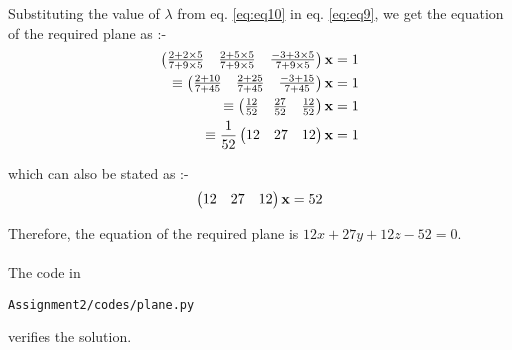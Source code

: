\documentclass[journal,12pt,twocolumn]{IEEEtran}
\renewcommand\thesection{\arabic{section}}
\begin{document}
\begin{enumerate}[label=\thesection.\arabic*.,ref=\thesection.\theenumi]
Substituting the value of $\lambda$ from eq. \eqref{eq:eq10} in eq. \eqref{eq:eq9}, we get the equation of the required plane as :-
\begin{align}
\begin{pmatrix}\frac{2 + 2 \times 5}{7 + 9 \times 5} & \frac{2 + 5 \times 5}{7 + 9 \times 5} & \frac{-3 + 3 \times 5}{7 + 9 \times 5}\end{pmatrix}\mathbf{x} = 1
\\
\equiv \begin{pmatrix}\frac{2 + 10}{7 + 45} & \frac{2 + 25}{7 + 45} & \frac{-3 + 15}{7 + 45}\end{pmatrix}\mathbf{x} = 1
\\
\equiv \begin{pmatrix}\frac{12}{52} & \frac{27}{52} & \frac{12}{52}\end{pmatrix}\mathbf{x} = 1
\\
\equiv \frac{1}{52} \begin{pmatrix}12 & 27 & 12\end{pmatrix}\mathbf{x} = 1
\end{align}

which can also be stated as :-
\begin{align}
\begin{pmatrix}12 & 27 & 12\end{pmatrix}\mathbf{x} = 52
\end{align}

Therefore, the equation of the required plane is $12x + 27y + 12z - 52 = 0$.\\
\\
The code in
\begin{lstlisting}
Assignment2/codes/plane.py
\end{lstlisting}
verifies the solution.

\end{enumerate}
\end{document}
